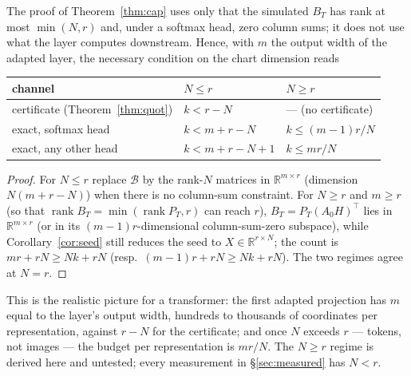 \begin{corollary}\label{cor:general}
The proof of Theorem~\ref{thm:cap} uses only that the simulated $B_T$ has
rank at most $\min(N,r)$ and, under a softmax head, zero column sums; it
does not use what the layer computes downstream. Hence, with $m$ the output
width of the adapted layer, the necessary condition on the chart dimension
reads
\begin{center}\small
\begin{tabular}{@{}lll@{}}\toprule
channel & $N\le r$ & $N\ge r$\\ \midrule
certificate (Theorem~\ref{thm:quot}) & $k<r-N$ & — (no certificate)\\
exact, softmax head & $k<m+r-N$ & $k\le (m-1)r/N$\\
exact, any other head & $k<m+r-N+1$ & $k\le mr/N$\\ \bottomrule
\end{tabular}
\end{center}
\end{corollary}
\begin{proof}
For $N\le r$ replace $\mathcal B$ by the rank-$N$ matrices in
$\mathbb R^{m\times r}$ (dimension $N(m+r-N)$) when there is no column-sum
constraint. For $N\ge r$ and $m\ge r$ (so that $\operatorname{rank}B_T=\min(\operatorname{rank}P_T,r)$
can reach $r$), $B_T=P_T(A_0H)^{\!\top}$ lies in $\mathbb R^{m\times r}$
(or in its $(m-1)r$-dimensional column-sum-zero subspace), while Corollary~\ref{cor:seed} still reduces the
seed to $X\in\mathbb R^{r\times N}$; the count is $mr+rN\ge Nk+rN$
(resp.\ $(m-1)r+rN\ge Nk+rN$). The two regimes agree at $N=r$.
\end{proof}
This is the realistic picture for a transformer: the first adapted
projection has $m$ equal to the layer's output width, hundreds to thousands
of coordinates per representation, against $r-N$ for the certificate; and
once $N$ exceeds $r$ — tokens, not images — the budget per representation is
$mr/N$. The $N\ge r$ regime is derived here and untested; every measurement
in \S\ref{sec:measured} has $N<r$.

